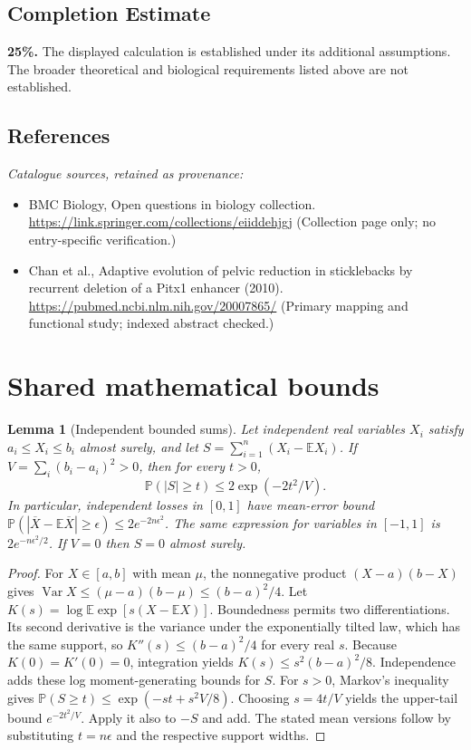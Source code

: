 \documentclass[11pt]{article}
\newcommand{\E}{\mathbb E}
\newcommand{\Prob}{\mathbb P}
\DeclareMathOperator{\Var}{Var}
\providecommand{\E}{\mathbb E}
\providecommand{\Prob}{\mathbb P}
\providecommand{\Var}{\operatorname{Var}}
\newtheorem{sharedlemma}{Lemma}[section]
\begin{document}
\subsection{Completion Estimate}
\textbf{25\%.} The displayed calculation is established under its additional assumptions. The broader theoretical and biological requirements listed above are not established.
\subsection{References}
\noindent\emph{Catalogue sources, retained as provenance:}
\begin{itemize}
\item BMC Biology, Open questions in biology collection. \url{https://link.springer.com/collections/eiiddehjgj} (Collection page only; no entry-specific verification.)
\item Chan et al., Adaptive evolution of pelvic reduction in sticklebacks by recurrent deletion of a Pitx1 enhancer (2010). \url{https://pubmed.ncbi.nlm.nih.gov/20007865/} (Primary mapping and functional study; indexed abstract checked.)
\end{itemize}
\clearpage


\appendix
\section{Shared mathematical bounds}\label{app:bounds}
\begin{sharedlemma}[Independent bounded sums]\label{lem:bounded}
Let independent real variables $X_i$ satisfy $a_i\leq X_i\leq b_i$ almost surely,
and let $S=\sum_{i=1}^n(X_i-\E X_i)$. If
$V=\sum_i(b_i-a_i)^2>0$, then for every $t>0$,
\[
 \Prob(|S|\geq t)\leq 2\exp(-2t^2/V).
\]
In particular, independent losses in $[0,1]$ have mean-error bound
$\Prob(|\overline X-\E\overline X|\geq\epsilon)
\leq2e^{-2n\epsilon^2}$. The same expression for variables in $[-1,1]$
is $2e^{-n\epsilon^2/2}$. If $V=0$ then $S=0$ almost surely.
\end{sharedlemma}
\begin{proof}
For $X\in[a,b]$ with mean $\mu$, the nonnegative product
$(X-a)(b-X)$ gives
$\Var X\leq(\mu-a)(b-\mu)\leq(b-a)^2/4$.
Let $K(s)=\log\E\exp[s(X-\E X)]$.
Boundedness permits two differentiations. Its second derivative is the variance
under the exponentially tilted law, which has the same support, so
$K''(s)\leq(b-a)^2/4$ for every real $s$.
Because $K(0)=K'(0)=0$, integration yields
$K(s)\leq s^2(b-a)^2/8$.
Independence adds these log moment-generating bounds for $S$.
For $s>0$, Markov's inequality gives
$\Prob(S\geq t)\leq\exp(-st+s^2V/8)$.
Choosing $s=4t/V$ yields the upper-tail bound $e^{-2t^2/V}$.
Apply it also to $-S$ and add. The stated mean versions follow by substituting
$t=n\epsilon$ and the respective support widths.
\end{proof}
\end{document}
